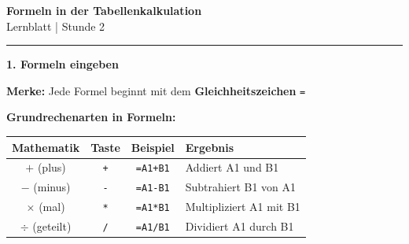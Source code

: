\documentclass[11pt, a4paper]{article}
\begin{document}
\begin{center}
    {\Large\bfseries\textcolor{fachfarbe}{Formeln in der Tabellenkalkulation}}\\[0.3em]
    {\small Lernblatt | Stunde 2}
\end{center}
\vspace{-0.3em}
\hrule
\vspace{0.8em}


\textbf{\textcolor{fachfarbe}{1. Formeln eingeben}}

\begin{merkkasten}
\textbf{Merke:} Jede Formel beginnt mit dem \textbf{Gleichheitszeichen} \texttt{=}
\end{merkkasten}

\textbf{Grundrechenarten in Formeln:}

\begin{center}
\begin{tabular}{c c c l}
\toprule
\textbf{Mathematik} & \textbf{Taste} & \textbf{Beispiel} & \textbf{Ergebnis} \\
\midrule
$+$ (plus) & \texttt{+} & \texttt{=A1+B1} & Addiert A1 und B1 \\
$-$ (minus) & \texttt{-} & \texttt{=A1-B1} & Subtrahiert B1 von A1 \\
$\times$ (mal) & \texttt{*} & \texttt{=A1*B1} & Multipliziert A1 mit B1 \\
$\div$ (geteilt) & \texttt{/} & \texttt{=A1/B1} & Dividiert A1 durch B1 \\
\bottomrule
\end{tabular}
\end{center}

\vspace{0.3em}
\end{document}
